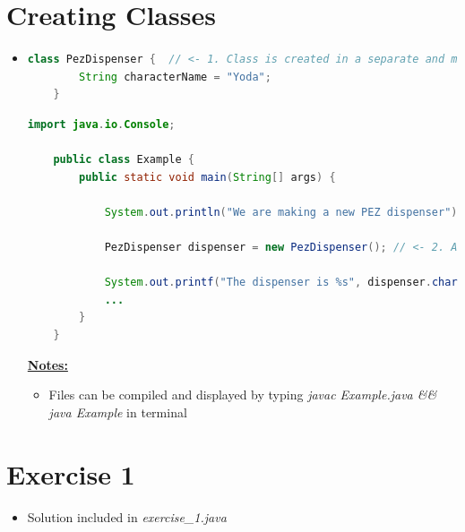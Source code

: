 \documentclass[12pt]{article}
\begin{document}
\bigskip

\section{Creating Classes}

\bigskip

\begin{itemize}
    \item

    \begin{lstlisting}[language=Java,caption={lesson\_3/PezDispenser.java}]
    class PezDispenser {  // <- 1. Class is created in a separate and matching file :)
        String characterName = "Yoda";
    }
    \end{lstlisting}

    \bigskip

    \begin{lstlisting}[language=Java,caption={lesson\_3/Example.java}]
    import java.io.Console;

    public class Example {
        public static void main(String[] args) {

            System.out.println("We are making a new PEZ dispenser");

            PezDispenser dispenser = new PezDispenser(); // <- 2. And is used here :)

            System.out.printf("The dispenser is %s", dispenser.characterName);
            ...
        }
    }
    \end{lstlisting}

    \bigskip

    \underline{\textbf{Notes:}}

    \bigskip

    \begin{itemize}
        \item Files can be compiled and displayed by typing \textit{javac Example.java \&\& java Example}
        in terminal
    \end{itemize}
\end{itemize}

\bigskip

\section{Exercise 1}

\bigskip

\begin{itemize}
    \item Solution included in \textit{exercise\_1.java}
\end{itemize}
\end{document}
